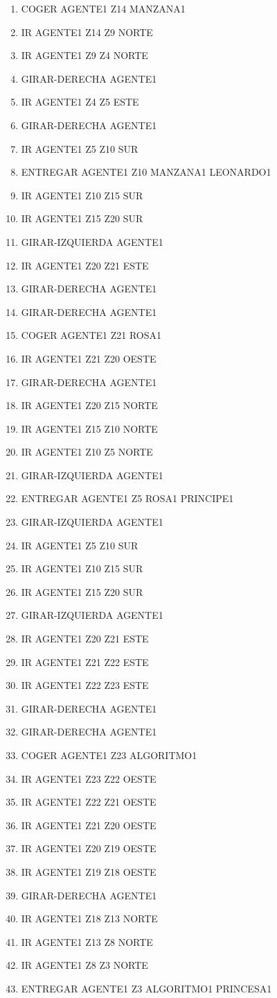 \documentclass[12pt,a4paper]{article}
\begin{document}
\begin{enumerate}
	\item COGER AGENTE1 Z14 MANZANA1
	\item IR AGENTE1 Z14 Z9 NORTE
	\item IR AGENTE1 Z9 Z4 NORTE
	\item GIRAR-DERECHA AGENTE1
	\item IR AGENTE1 Z4 Z5 ESTE
	\item GIRAR-DERECHA AGENTE1
	\item IR AGENTE1 Z5 Z10 SUR
	\item ENTREGAR AGENTE1 Z10 MANZANA1 LEONARDO1
	\item IR AGENTE1 Z10 Z15 SUR
	\item IR AGENTE1 Z15 Z20 SUR
	\item GIRAR-IZQUIERDA AGENTE1
	\item IR AGENTE1 Z20 Z21 ESTE
	\item GIRAR-DERECHA AGENTE1
	\item GIRAR-DERECHA AGENTE1
	\item COGER AGENTE1 Z21 ROSA1
	\item IR AGENTE1 Z21 Z20 OESTE
	\item GIRAR-DERECHA AGENTE1
	\item IR AGENTE1 Z20 Z15 NORTE
	\item IR AGENTE1 Z15 Z10 NORTE
	\item IR AGENTE1 Z10 Z5 NORTE
	\item GIRAR-IZQUIERDA AGENTE1
	\item ENTREGAR AGENTE1 Z5 ROSA1 PRINCIPE1
	\item GIRAR-IZQUIERDA AGENTE1
	\item IR AGENTE1 Z5 Z10 SUR
	\item IR AGENTE1 Z10 Z15 SUR
	\item IR AGENTE1 Z15 Z20 SUR
	\item GIRAR-IZQUIERDA AGENTE1
	\item IR AGENTE1 Z20 Z21 ESTE
	\item IR AGENTE1 Z21 Z22 ESTE
	\item IR AGENTE1 Z22 Z23 ESTE
	\item GIRAR-DERECHA AGENTE1
	\item GIRAR-DERECHA AGENTE1
	\item COGER AGENTE1 Z23 ALGORITMO1
	\item IR AGENTE1 Z23 Z22 OESTE
	\item IR AGENTE1 Z22 Z21 OESTE
	\item IR AGENTE1 Z21 Z20 OESTE
	\item IR AGENTE1 Z20 Z19 OESTE
	\item IR AGENTE1 Z19 Z18 OESTE
	\item GIRAR-DERECHA AGENTE1
	\item IR AGENTE1 Z18 Z13 NORTE
	\item IR AGENTE1 Z13 Z8 NORTE
	\item IR AGENTE1 Z8 Z3 NORTE
	\item ENTREGAR AGENTE1 Z3 ALGORITMO1 PRINCESA1
\end{enumerate}
\end{document}
